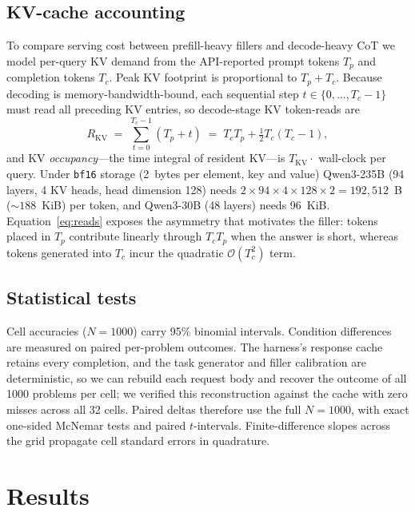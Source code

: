 \documentclass[11pt,a4paper]{article}
\begin{document}
\subsection{KV-cache accounting}
\label{sec:kvacct}

To compare serving cost between prefill-heavy fillers and decode-heavy CoT we
model per-query KV demand from the API-reported prompt tokens $T_p$ and
completion tokens $T_c$. Peak KV footprint is proportional to $T_p+T_c$. Because
decoding is memory-bandwidth-bound, each sequential step $t\in\{0,\dots,T_c-1\}$
must read all preceding KV entries, so decode-stage KV token-reads are
\begin{equation}
\label{eq:reads}
R_{\mathrm{KV}} \;=\; \sum_{t=0}^{T_c-1}(T_p+t)
\;=\; T_cT_p+\tfrac{1}{2}T_c(T_c-1),
\end{equation}
and KV \emph{occupancy}---the time integral of resident KV---is
$T_{\mathrm{KV}}\cdot$ wall-clock per query. Under \texttt{bf16} storage
(2~bytes per element, key and value) Qwen3-235B (94 layers, 4 KV heads, head
dimension 128) needs $2\times94\times4\times128\times2=192{,}512$~B
(${\sim}188$~KiB) per token, and Qwen3-30B (48 layers) needs 96~KiB.
Equation~\eqref{eq:reads} exposes the asymmetry that motivates the filler:
tokens placed in $T_p$ contribute linearly through $T_cT_p$ when the answer is
short, whereas tokens generated into $T_c$ incur the quadratic
$\mathcal{O}(T_c^2)$ term.

\subsection{Statistical tests}
\label{sec:stats}

Cell accuracies ($N{=}1000$) carry 95\% binomial intervals. Condition
differences are measured on paired per-problem outcomes. The harness's response
cache retains every completion, and the task generator and filler calibration are
deterministic, so we can rebuild each request body and recover the outcome of all
1000 problems per cell; we verified this reconstruction against the cache with
zero misses across all 32 cells. Paired deltas therefore use the full $N{=}1000$,
with exact one-sided McNemar tests and paired $t$-intervals. Finite-difference
slopes across the grid propagate cell standard errors in quadrature.

\section{Results}
\label{sec:results}
\end{document}
